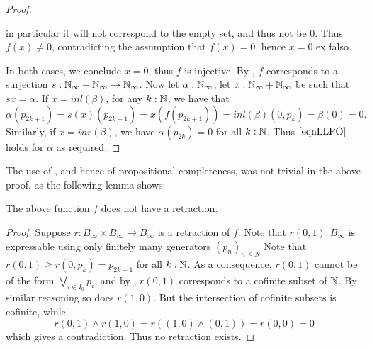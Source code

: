 \begin{proof}
\begin{itemize}
      in particular it will not correspond to the empty set, and thus not be $0$.
      Thus $f(x)\neq 0$, contradicting the assumption that $f(x) = 0$, hence $x=0$ ex falso. 
  \end{itemize}
  In both cases, we conclude $x=0$, thus $f$ is injective. 
  By , $f$ corresponds to a surjection 
  $s:\mathbb{N}_{\infty} + \mathbb{N}_{\infty} \to \mathbb{N}_{\infty}$.
  Now let $\alpha : \mathbb{N}_{\infty}$, 
  let $x:\mathbb{N}_{\infty} + \mathbb{N}_{\infty}$ be such that $s x = \alpha$. 
  If $x = inl(\beta)$, 
  for any $k:\mathbb{N}$, we have that 
  $$\alpha (p_{2k+1}) = s(x) (p_{2k+1}) = x(f(p_{2k+1})) = inl(\beta) (0,p_k)  = \beta(0) = 0.$$
  Similarly, if $x = inr(\beta)$, we have $\alpha(p_{2k}) = 0$ for all $k:\mathbb{N}$. 
  Thus $\Cref{eqnLLPO}$ holds for $\alpha$ as required. 
\end{proof}

The use of , and hence of propositional completeness, 
was not trivial in the above proof, as the following lemma shows:
\begin{lemma}
  The above function $f$ does not have a retraction. 
\end{lemma}
\begin{proof}
  Suppose $r:B_\infty \times B_\infty \to B_\infty$ is a retraction of $f$. 
  Note that $r(0,1):B_\infty$ is expressable using only finitely many generators $(p_n)_{n\leq N}$
  Note that $r(0,1) \geq r(0,p_k) = p_{2k+1}$ for all $k:\mathbb{N}$. 
  As a consequence, $r(0,1)$ cannot be of the form $\bigvee_{i\in I_0} p_i$, and by , 
  $r(0,1)$ corresponds to a cofinite subset of $\mathbb{N}$. %
  By similar reasoning so does $r(1,0)$.%
  But the intersection of cofinite subsets is cofinite, while 
  $$r(0,1) \wedge r(1,0) = r( (1,0) \wedge (0,1)) = r(0,0) = 0$$
  which gives a contradiction. Thus no retraction exists. 
\end{proof}

